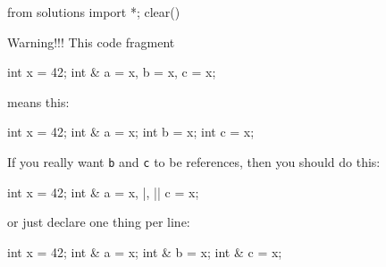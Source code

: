 \begin{python0}
from solutions import *; clear()
\end{python0}

Warning!!! This code fragment

\begin{consolethree}[escapeinside=||]
int x = 42;
int & a = x, b = x, c = x;
\end{consolethree}

means this:

\begin{consolethree}[escapeinside=||]
int x = 42;
int & a = x;
int b = x;
int c = x;
\end{consolethree}

If you really want \texttt{b} and \texttt{c} to be references, then you should do this:

\begin{consolethree}[escapeinside=||]
int x = 42;
int & a = x, |, |\EMPHASIZE{\&}| c = x;
\end{consolethree}

or just declare one thing per line:

\begin{consolethree}[escapeinside=||]
int x = 42;
int & a = x;
int & b = x;
int & c = x;
\end{consolethree}


